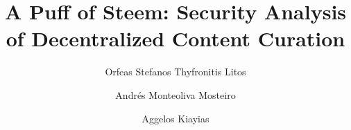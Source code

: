 \title{A Puff of Steem: Security Analysis of Decentralized Content Curation}
\author{Orfeas Stefanos Thyfronitis Litos \and Andr\'es Monteoliva
Mosteiro \and Aggelos Kiayias}
\maketitle

